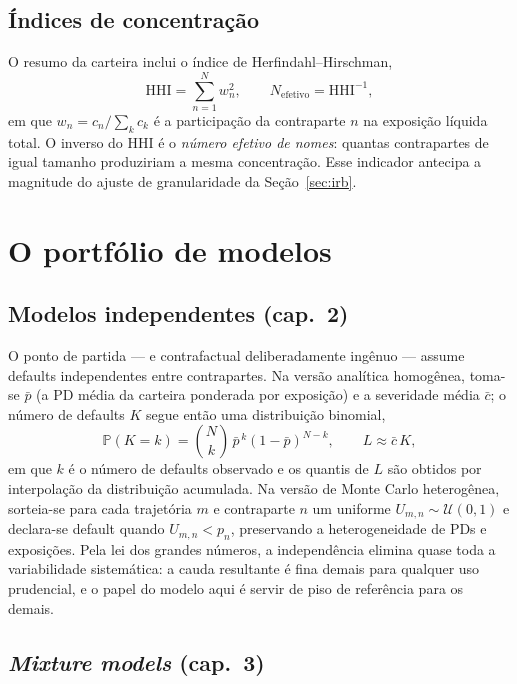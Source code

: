\documentclass[11pt,a4paper]{article}
\newcommand{\Prob}{\mathbb{P}}
\begin{document}
\subsection{Índices de concentração}

O resumo da carteira inclui o índice de Herfindahl--Hirschman,
\begin{equation}
\mathrm{HHI}=\sum_{n=1}^N w_n^2, \qquad N_{\mathrm{efetivo}} = \mathrm{HHI}^{-1},
\end{equation}
em que $w_n = c_n/\sum_k c_k$ é a participação da contraparte $n$ na exposição líquida total. O inverso do HHI é o \emph{número efetivo de nomes}: quantas contrapartes de igual tamanho produziriam a mesma concentração. Esse indicador antecipa a magnitude do ajuste de granularidade da Seção~\ref{sec:irb}.

\section{O portfólio de modelos}

\subsection{Modelos independentes (cap.~2)}

O ponto de partida --- e contrafactual deliberadamente ingênuo --- assume defaults independentes entre contrapartes. Na versão analítica homogênea, toma-se $\bar p$ (a PD média da carteira ponderada por exposição) e a severidade média $\bar c$; o número de defaults $K$ segue então uma distribuição binomial,
\begin{equation}
\Prob(K=k)=\binom{N}{k}\,\bar p^{\,k}(1-\bar p)^{N-k},
\qquad
L \approx \bar c\,K,
\end{equation}
em que $k$ é o número de defaults observado e os quantis de $L$ são obtidos por interpolação da distribuição acumulada. Na versão de Monte Carlo heterogênea, sorteia-se para cada trajetória $m$ e contraparte $n$ um uniforme $U_{m,n}\sim\mathcal U(0,1)$ e declara-se default quando $U_{m,n}<p_n$, preservando a heterogeneidade de PDs e exposições. Pela lei dos grandes números, a independência elimina quase toda a variabilidade sistemática: a cauda resultante é fina demais para qualquer uso prudencial, e o papel do modelo aqui é servir de piso de referência para os demais.

\subsection{\emph{Mixture models} (cap.~3)}
\end{document}
